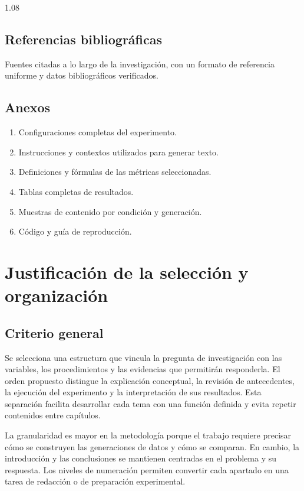 \documentclass[12pt,letterpaper]{article}
\begin{document}
\begin{spacing}{1.08}
\subsection*{Referencias bibliográficas}
Fuentes citadas a lo largo de la investigación, con un formato de referencia
uniforme y datos bibliográficos verificados.

\subsection*{Anexos}
\begin{enumerate}[label=\Alph*.,leftmargin=0.8cm,itemsep=2pt,topsep=4pt]
\item Configuraciones completas del experimento.
\item Instrucciones y contextos utilizados para generar texto.
\item Definiciones y fórmulas de las métricas seleccionadas.
\item Tablas completas de resultados.
\item Muestras de contenido por condición y generación.
\item Código y guía de reproducción.
\end{enumerate}
\end{spacing}

\clearpage
\section*{Justificación de la selección y organización}

\subsection*{Criterio general}
Se selecciona una estructura que vincula la pregunta de investigación con las
variables, los procedimientos y las evidencias que permitirán responderla.
El orden propuesto distingue la explicación conceptual, la revisión de
antecedentes, la ejecución del experimento y la interpretación de sus
resultados. Esta separación facilita desarrollar cada tema con una función
definida y evita repetir contenidos entre capítulos.

La granularidad es mayor en la metodología porque el trabajo requiere
precisar cómo se construyen las generaciones de datos y cómo se comparan.
En cambio, la introducción y las conclusiones se mantienen centradas en el
problema y su respuesta. Los niveles de numeración permiten convertir cada
apartado en una tarea de redacción o de preparación experimental.
\end{document}
